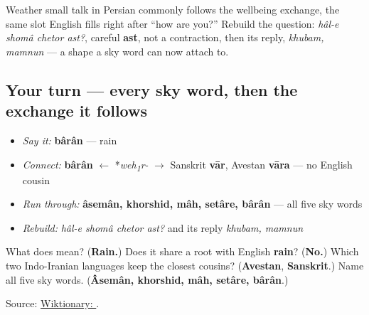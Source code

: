 \begin{grammarlens}[title={Grammar Lens: what small talk about the sky follows}]
Weather small talk in Persian commonly follows the wellbeing exchange, the same slot English fills right after \textquotedblleft{}how are you?\textquotedblright{} Rebuild the question: \emph{hâl-e shomâ chetor ast?}, careful \textbf{ast}, not a contraction, then its reply, \emph{khubam, mamnun} — a shape a sky word can now attach to.
\end{grammarlens}

\subsection*{Your turn — every sky word, then the exchange it follows}
\begin{itemize}
\raggedright
  \item \emph{Say it:} \textbf{bârân} — rain
  \item \emph{Connect:} \textbf{bârân} $\leftarrow$ *\emph{weh\textsubscript{1}r-} $\to$ Sanskrit \textbf{vār}, Avestan \textbf{vāra} — no English cousin
  \item \emph{Run through:} \textbf{âsemân, khorshid, mâh, setâre, bârân} — all five sky words
  \item \emph{Rebuild:} \emph{hâl-e shomâ chetor ast?} and its reply \emph{khubam, mamnun}
\end{itemize}

\begin{tcolorbox}[breakable,colback=teal!4,colframe=teal!35!black,title={Before you move on}]
What does \textbf{} mean? (\textbf{Rain.}) Does it share a root with English \textbf{rain}? (\textbf{No.}) Which two Indo-Iranian languages keep the closest cousins? (\textbf{Avestan}, \textbf{Sanskrit}.) Name all five sky words. (\textbf{Âsemân, khorshid, mâh, setâre, bârân}.)

Source: \href{https://en.wiktionary.org/wiki/\%D8\%A8\%D8\%A7\%D8\%B1\%D8\%A7\%D9\%86}{Wiktionary: }.
\end{tcolorbox}
